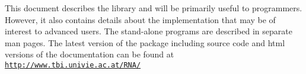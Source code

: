 This document describes the library and will be primarily useful to programmers. However, it also contains details about the implementation that may be of interest to advanced users. The stand-\/alone programs are described in separate man pages. The latest version of the package including source code and html versions of the documentation can be found at ~\newline
~\newline
\href{http://www.tbi.univie.ac.at/RNA/}{\tt http\+://www.\+tbi.\+univie.\+ac.\+at/\+R\+N\+A/} 